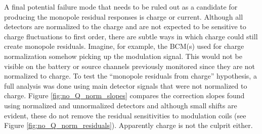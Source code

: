 A final potential failure mode that needs to be ruled out as a candidate for producing the monopole residual responses is charge or current. Although all detectors are normalized to the charge and are not expected to be sensitive to charge fluctuations to first order, there are subtle ways in which charge could still create monopole residuals. Imagine, for example, the BCM(s) used for charge normalization somehow picking up the modulation signal. This would not be visible on the battery or source channels previously monitored since they are not normalized to charge. To test the ``monopole residuals from charge'' hypothesis, a full analysis was done using main detector signals that were not normalized to charge. Figure \ref{fig:no_Q_norm_slopes}  compares the correction slopes found using normalized and unnormalized detectors and although small shifts are evident, these do not remove the residual sensitivities to modulation coils (see Figure \ref{fig:no_Q_norm_residuals}). Apparently charge is not the culprit either.
